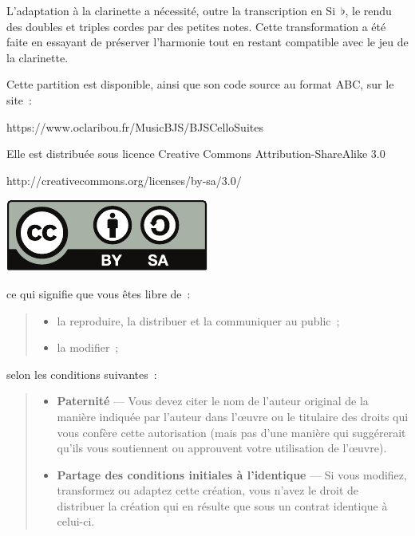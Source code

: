 \documentclass[a4paper,twoside]{article}
\newcommand{\includerh}[3][0pt]{%
  \raisebox{#1}{\texttt{[image: \#3]}}%
}
\begin{document}
L'adaptation à la clarinette a nécessité, outre la transcription en Si~\(\flat\), le rendu des doubles 
et triples cordes par des petites notes. Cette transformation a été faite en essayant de préserver
l'harmonie tout en restant compatible avec le jeu de la clarinette.

\bigskip

Cette partition est disponible, ainsi que son code source au format ABC, sur le site~:

\smallskip

\centerline{https://www.oclaribou.fr/MusicBJS/BJSCelloSuites}

\bigskip

Elle est distribuée sous licence Creative Commons Attribution-ShareAlike 3.0

\centerline{http://creativecommons.org/licenses/by-sa/3.0/}

\medskip

\centerline{\includegraphics{inc/by-sa}}

\medskip

ce qui signifie que vous êtes libre de~:
\begin{quote}
\begin{itemize}
  \item[{\includerh[-2ex]{5ex}{inc/share}}] la reproduire, la distribuer et la communiquer au public~;
  
  \item[{\includerh[-2ex]{5ex}{inc/remix}}] la modifier~;
\end{itemize}
\end{quote}

selon les conditions suivantes~:
\begin{quote}
\begin{itemize}
  \item[{\includerh[-2ex]{5ex}{inc/by}}] \textbf{Paternité} --- Vous devez citer le nom de 
  l'auteur original de la manière indiquée par l'auteur dans l'œuvre ou le titulaire des droits 
  qui vous confère cette autorisation (mais pas d'une manière qui suggérerait qu'ils vous 
  soutiennent ou approuvent votre utilisation de l'œuvre).
  
  \item[{\includerh[-2ex]{5ex}{inc/sa}}] \textbf{Partage des conditions initiales à l'identique} ---
  Si vous modifiez, transformez ou adaptez cette création, vous n'avez le droit de distribuer la 
  création qui en résulte que sous un contrat identique à celui-ci.
\end{itemize}
\end{quote}
\end{document}
